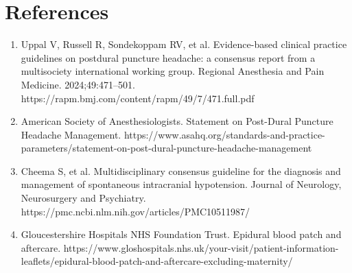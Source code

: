 \section*{References}
\begin{enumerate}
  \item Uppal V, Russell R, Sondekoppam RV, et al. Evidence-based clinical practice guidelines on postdural puncture headache: a consensus report from a multisociety international working group. Regional Anesthesia and Pain Medicine. 2024;49:471--501. https://rapm.bmj.com/content/rapm/49/7/471.full.pdf
  \item American Society of Anesthesiologists. Statement on Post-Dural Puncture Headache Management. https://www.asahq.org/standards-and-practice-parameters/statement-on-post-dural-puncture-headache-management
  \item Cheema S, et al. Multidisciplinary consensus guideline for the diagnosis and management of spontaneous intracranial hypotension. Journal of Neurology, Neurosurgery and Psychiatry. https://pmc.ncbi.nlm.nih.gov/articles/PMC10511987/
  \item Gloucestershire Hospitals NHS Foundation Trust. Epidural blood patch and aftercare. https://www.gloshospitals.nhs.uk/your-visit/patient-information-leaflets/epidural-blood-patch-and-aftercare-excluding-maternity/
\end{enumerate}

\clearpage
